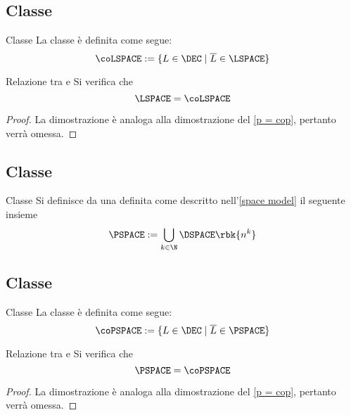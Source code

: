 \documentclass[a4paper, 12pt]{report}
\begin{document}
    \subsection{Classe \coLSPACE}

    \begin{frameddefn}{Classe \coLSPACE}
        La classe \coLSPACE è definita come segue: $$\coLSPACE := \{L \in \DEC \mid \overline L \in \LSPACE\}$$
    \end{frameddefn}

    \begin{framedthm}{Relazione tra \LSPACE e \coLSPACE}
        Si verifica che $$\LSPACE = \coLSPACE$$
    \end{framedthm}

    \begin{proof}
        La dimostrazione è analoga alla dimostrazione del \cref{p = cop}, pertanto verrà omessa.
    \end{proof}

    \subsection{Classe \PSPACE}

    \begin{frameddefn}{Classe \PSPACE}
        Si definisce  da una \TM definita come descritto nell'\cref{space model} il seguente insieme $$\PSPACE := \displaystyle \bigcup_{k \in \N}{\DSPACE \rbk{n^k}}$$
    \end{frameddefn}

    \subsection{Classe \coPSPACE}

    \begin{frameddefn}{Classe \coPSPACE}
        La classe \coPSPACE è definita come segue: $$\coPSPACE := \{L \in \DEC \mid \overline L \in \PSPACE\}$$
    \end{frameddefn}

    \begin{framedthm}{Relazione tra \PSPACE e \coPSPACE}
        Si verifica che $$\PSPACE = \coPSPACE$$
    \end{framedthm}

    \begin{proof}
        La dimostrazione è analoga alla dimostrazione del \cref{p = cop}, pertanto verrà omessa.
    \end{proof}
\end{document}
